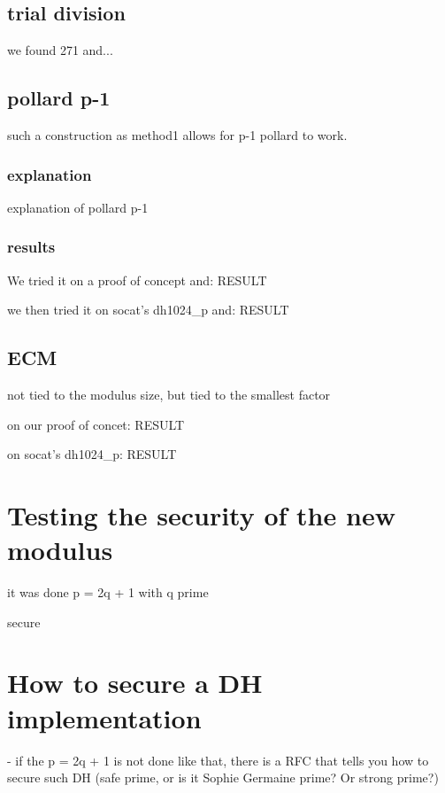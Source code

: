 \documentclass[a4paper,11pt]{article}
\begin{document}
\subsection{trial division}

we found 271 and...

\subsection{pollard p-1}

such a construction as method1 allows for p-1 pollard to work.

\subsubsection{explanation}

explanation of pollard p-1

\subsubsection{results}

We tried it on a proof of concept and: RESULT

we then tried it on socat's dh1024_p and: RESULT

\subsection{ECM}

not tied to the modulus size, but tied to the smallest factor

on our proof of concet: RESULT

on socat's dh1024_p: RESULT

\section{Testing the security of the new modulus}

it was done p = 2q + 1 with q prime

secure

\section{How to secure a DH implementation}

- if the p = 2q + 1 is not done like that, there is a RFC that tells you how to secure such DH (safe prime, or is it Sophie Germaine prime? Or strong prime?)
\end{document}
